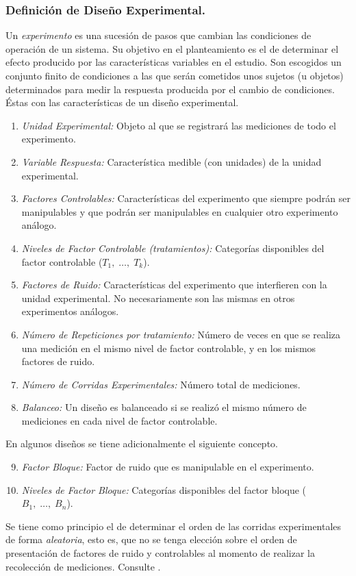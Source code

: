 \documentclass[11pt,a4paper]{article}
\begin{document}
\subsubsection{Definición de Diseño Experimental.} %
\label{subs:definicion_de}
Un \textit{experimento} es una sucesión de pasos que cambian las condiciones de operación de un sistema.
Su objetivo en el planteamiento es el de determinar el efecto producido por las características variables en el estudio.
Son escogidos un conjunto finito de condiciones a las que serán cometidos unos sujetos (u objetos) determinados para medir la respuesta producida por el cambio de condiciones. \\[2mm]
Éstas con las características de un diseño experimental.
\begin{enumerate}
	\item \textit{Unidad Experimental:} Objeto al que se registrará las mediciones de todo el experimento.
	\item \textit{Variable Respuesta:} Característica medible (con unidades) de la unidad experimental.
	\item \textit{Factores Controlables:} Características del experimento que siempre podrán ser manipulables y que podrán ser manipulables en cualquier otro experimento análogo.
	\item \textit{Niveles de Factor Controlable (tratamientos):} Categorías disponibles del factor controlable (\(T_1, \;\ldots,\; T_k\)).
	\item \textit{Factores de Ruido:} Características del experimento que interfieren con la unidad experimental. No necesariamente son las mismas en otros experimentos análogos.
	\item \textit{Número de Repeticiones por tratamiento:} Número de veces en que se realiza una medición en el mismo nivel de factor controlable, y en los mismos factores de ruido.
	\item \textit{Número de Corridas Experimentales:} Número total de mediciones.
	\item \textit{Balanceo:} Un diseño es balanceado si se realizó el mismo número de mediciones en cada nivel de factor controlable.
\end{enumerate}
En algunos diseños se tiene adicionalmente el siguiente concepto.
\begin{enumerate}
	\setcounter{enumi}{8}
	\item \textit{Factor Bloque:} Factor de ruido que es manipulable en el experimento.
	\item \textit{Niveles de Factor Bloque:} Categorías disponibles del factor bloque (\(B_1, \;\ldots,\; B_n\)).
\end{enumerate}
Se tiene como principio el de determinar el orden de las corridas experimentales de forma \textit{aleatoria}, esto es, que no se tenga elección sobre el orden de presentación de factores de ruido y controlables al momento de realizar la recolección de mediciones.
Consulte .
\end{document}
